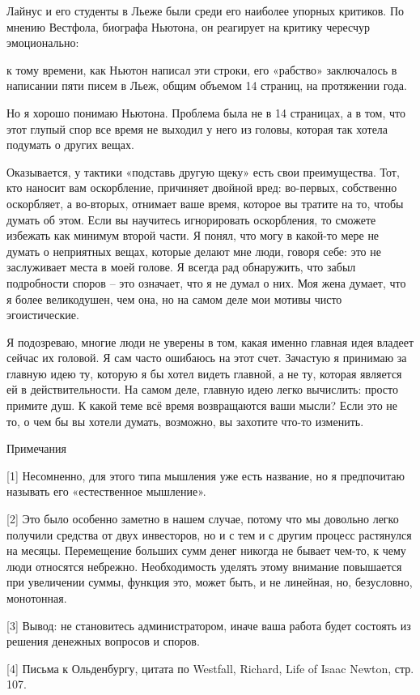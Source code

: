 \documentclass[ebook,12pt,oneside,openany]{memoir}
\begin{document}
Лайнус и его студенты в Льеже были среди его наиболее упорных
критиков. По мнению Вестфола, биографа Ньютона, он реагирует на
критику чересчур эмоционально:

к тому времени, как Ньютон написал эти строки, его «рабство»
заключалось в написании пяти писем в Льеж, общим объемом 14 страниц,
на протяжении года.


Но я хорошо понимаю Ньютона. Проблема была не в 14 страницах, а в том,
что этот глупый спор все время не выходил у него из головы, которая
так хотела подумать о других вещах.

Оказывается, у тактики «подставь другую щеку» есть свои преимущества.
Тот, кто наносит вам оскорбление, причиняет двойной вред: во-первых,
собственно оскорбляет, а во-вторых, отнимает ваше время, которое вы
тратите на то, чтобы думать об этом. Если вы научитесь игнорировать
оскорбления, то сможете избежать как минимум второй части. Я понял,
что могу в какой-то мере не думать о неприятных вещах, которые делают
мне люди, говоря себе: это не заслуживает места в моей голове. Я
всегда рад обнаружить, что забыл подробности споров – это означает,
что я не думал о них. Моя жена думает, что я более великодушен, чем
она, но на самом деле мои мотивы чисто эгоистические.

Я подозреваю, многие люди не уверены в том, какая именно главная идея
владеет сейчас их головой. Я сам часто ошибаюсь на этот счет. Зачастую
я принимаю за главную идею ту, которую я бы хотел видеть главной, а не
ту, которая является ей в действительности. На самом деле, главную
идею легко вычислить: просто примите душ. К какой теме всё время
возвращаются ваши мысли? Если это не то, о чем бы вы хотели думать,
возможно, вы захотите что-то изменить.

Примечания

[1] Несомненно, для этого типа мышления уже есть название, но я
предпочитаю называть его «естественное мышление».

[2] Это было особенно заметно в нашем случае, потому что мы довольно
легко получили средства от двух инвесторов, но и с тем и с другим
процесс растянулся на месяцы. Перемещение больших сумм денег никогда
не бывает чем-то, к чему люди относятся небрежно. Необходимость
уделять этому внимание повышается при увеличении суммы, функция это,
может быть, и не линейная, но, безусловно, монотонная.

[3] Вывод: не становитесь администратором, иначе ваша работа будет
состоять из решения денежных вопросов и споров.

[4] Письма к Ольденбургу, цитата по Westfall, Richard, Life of Isaac
Newton, стр. 107.
\end{document}
